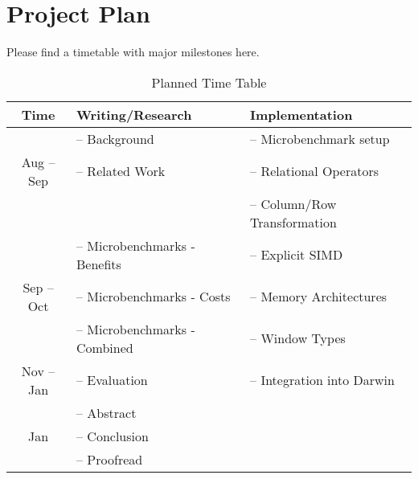 \section{Project Plan}
\label{sec:plan}

Please find a timetable with major milestones here.

\begin{table}[h!]
    \centering
    \begin{tabular}{ | c | m{} | m{} | }
        \hline
        \textbf{Time}   & \textbf{Writing/Research}   & \textbf{Implementation} \\
        \hline
                        & -- Background                 & -- Microbenchmark setup\\
        Aug -- Sep      & -- Related Work               & -- Relational Operators\\
                        &                               & -- Column/Row Transformation\\
        \hline
                        & -- Microbenchmarks - Benefits & -- Explicit SIMD\\
        Sep -- Oct      & -- Microbenchmarks - Costs    & -- Memory Architectures\\
                        & -- Microbenchmarks - Combined & -- Window Types\\
        \hline        
        Nov -- Jan      & -- Evaluation                 & -- Integration into Darwin\\
        \hline
                        & -- Abstract                   &\\
        Jan             & -- Conclusion                 &\\
                        & -- Proofread                  &\\
        \hline
    \end{tabular}
    \caption{Planned Time Table}
    \label{tab:time-table}
\end{table}
